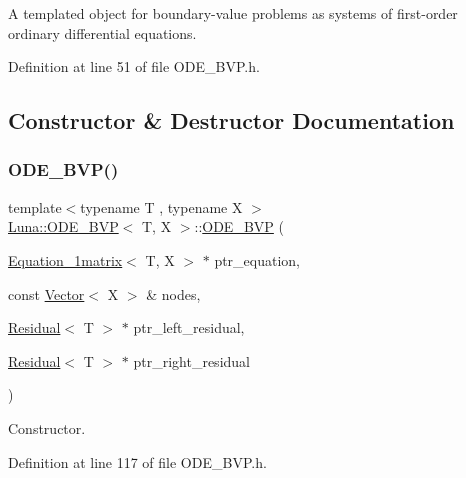 A templated object for boundary-\/value problems as systems of first-\/order ordinary differential equations. 



Definition at line 51 of file O\+D\+E\+\_\+\+B\+V\+P.\+h.



\subsection{Constructor \& Destructor Documentation}
\mbox{\label{classLuna_1_1ODE__BVP_adc692c5395375409ac3df8ec8b9ec32b}} 
\subsubsection{\texorpdfstring{O\+D\+E\+\_\+\+B\+V\+P()}{ODE\_BVP()}}
{\footnotesize\ttfamily template$<$typename T , typename X $>$ \\
\hyperlink{classLuna_1_1ODE__BVP}{Luna\+::\+O\+D\+E\+\_\+\+B\+VP}$<$ T, X $>$\+::\hyperlink{classLuna_1_1ODE__BVP}{O\+D\+E\+\_\+\+B\+VP} (\begin{DoxyParamCaption}\item[{\hyperlink{classLuna_1_1Equation__1matrix}{Equation\+\_\+1matrix}$<$ T, X $>$ $\ast$}]{ptr\+\_\+equation,  }\item[{const \hyperlink{classLuna_1_1Vector}{Vector}$<$ X $>$ \&}]{nodes,  }\item[{\hyperlink{classLuna_1_1Residual}{Residual}$<$ T $>$ $\ast$}]{ptr\+\_\+left\+\_\+residual,  }\item[{\hyperlink{classLuna_1_1Residual}{Residual}$<$ T $>$ $\ast$}]{ptr\+\_\+right\+\_\+residual }\end{DoxyParamCaption})}



Constructor. 



Definition at line 117 of file O\+D\+E\+\_\+\+B\+V\+P.\+h.


